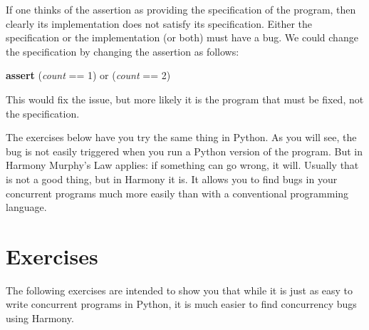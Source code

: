 \documentclass{report}
\newenvironment{code}{
\tcolorbox
}{
\endtcolorbox
}
\begin{document}
%

If one thinks of the assertion as providing the specification of the
program, then clearly its implementation does not satisfy its specification.
Either the specification or the implementation (or both) must have a bug.
We could change the specification by changing the assertion as follows:

\begin{code}
\textbf{assert} (\textit{count} == 1) or (\textit{count} == 2)
\end{code}

This would fix the issue, but more likely it is the program that must
be fixed, not the specification.

The exercises below have you try the same thing in Python.  As you will
see, the bug is not easily triggered when you run a Python version of
the program.  But in Harmony Murphy's Law applies:
if something can go wrong, it will.  Usually that is not a good thing,
but in Harmony it is.  It allows you to find bugs in your concurrent
programs much more easily than with a conventional programming language.

\section*{Exercises}

The following exercises are intended to show you that while it is just
as easy to write concurrent programs in Python, it is much easier to
find concurrency bugs using Harmony.
\end{document}
